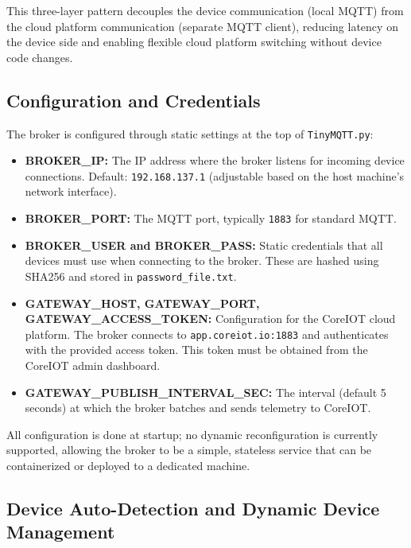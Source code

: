This three-layer pattern decouples the device communication (local MQTT) from the cloud platform communication (separate MQTT client), reducing latency on the device side and enabling flexible cloud platform switching without device code changes.

\subsection*{Configuration and Credentials}

The broker is configured through static settings at the top of \texttt{TinyMQTT.py}:
\begin{itemize}
  \item \textbf{BROKER\_IP:} The IP address where the broker listens for incoming device connections. Default: \texttt{192.168.137.1} (adjustable based on the host machine's network interface).
  \item \textbf{BROKER\_PORT:} The MQTT port, typically \texttt{1883} for standard MQTT.
  \item \textbf{BROKER\_USER and BROKER\_PASS:} Static credentials that all devices must use when connecting to the broker. These are hashed using SHA256 and stored in \texttt{password\_file.txt}.
  \item \textbf{GATEWAY\_HOST, GATEWAY\_PORT, GATEWAY\_ACCESS\_TOKEN:} Configuration for the CoreIOT cloud platform. The broker connects to \texttt{app.coreiot.io:1883} and authenticates with the provided access token. This token must be obtained from the CoreIOT admin dashboard.
  \item \textbf{GATEWAY\_PUBLISH\_INTERVAL\_SEC:} The interval (default 5 seconds) at which the broker batches and sends telemetry to CoreIOT.
\end{itemize}

All configuration is done at startup; no dynamic reconfiguration is currently supported, allowing the broker to be a simple, stateless service that can be containerized or deployed to a dedicated machine.

\subsection*{Device Auto-Detection and Dynamic Device Management}

